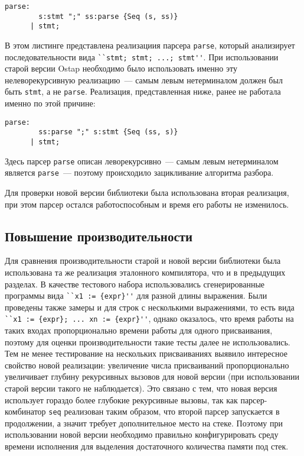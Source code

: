 \documentclass[conference]{IEEEtran}
\begin{document}
\begin{lstlisting}[basicstyle=\small]
  parse:
        s:stmt ";" ss:parse {Seq (s, ss)}
      | stmt;
\end{lstlisting}

В этом листинге представлена реализациия парсера \lstinline|parse|, который анализирует последовательности вида \lstinline|``stmt; stmt; ...; stmt''|. При использовании старой
версии Ostap необходимо было использовать именно эту нелеворекурсивную реализацию~--- самым левым нетерминалом должен был быть \lstinline|stmt|, а не \lstinline|parse|. Реализация,
представленная ниже, ранее не работала именно по этой причине:

\begin{lstlisting}[basicstyle=\small]
  parse:
        ss:parse ";" s:stmt {Seq (ss, s)}
      | stmt;
\end{lstlisting}

Здесь парсер \lstinline|parse| описан леворекурсивно~--- самым левым нетерминалом является \lstinline|parse|~--- поэтому происходило зацикливание алгоритма разбора.

Для проверки новой версии библиотеки была использована вторая реализация, при этом парсер остался работоспособным и время его работы не изменилось.

\subsection{Повышение производительности}

Для сравнения производительности старой и новой версии библиотеки была использована та же реализация эталонного компилятора, что и в предыдущих разделах. В качестве тестового
набора использовались сгенерированные программы вида \lstinline|``x1 := {expr}''| для разной длины выражения.  Были проведены также замеры и для строк с несколькими
выражениями, то есть вида \lstinline|``x1 := {expr}; ... xn := {expr}''|, однако оказалось, что время работы на таких входах пропорционально времени работы для одного присваивания,
поэтому для оценки производительности такие тесты далее не использовались. Тем не менее тестирование на нескольких присваиваниях выявило интересное свойство новой реализации:
увеличение числа присваиваний пропорционально увеличивает глубину рекурсивных вызовов для новой версии (при использовании старой версии такого не наблюдается). Это связано с тем,
что новая версия использует гораздо более глубокие рекурсивные вызовы, так как парсер-комбинатор \lstinline|seq| реализован таким образом, что второй парсер запускается в продолжении,
а значит требует дополнительное место на стеке. Поэтому при использовании новой версии необходимо правильно конфигурировать среду времени исполнения для выделения достаточного
количества памяти под стек.
\end{document}
